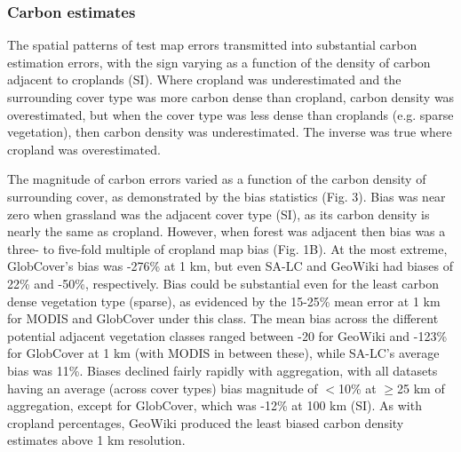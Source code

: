 \documentclass[a4paper]{article}
\begin{document}
\subsubsection*{Carbon estimates}
\vspace{-0.2 cm}
The spatial patterns of test map errors transmitted into substantial carbon estimation errors, with the sign varying as a function of the density of carbon adjacent to croplands (SI). Where cropland was underestimated and the surrounding cover type was more carbon dense than cropland, carbon density was overestimated, but when the cover type was less dense than croplands (e.g. sparse vegetation), then carbon density was underestimated. The inverse was true where cropland was overestimated. 

The magnitude of carbon errors varied as a function of the carbon density of surrounding cover, as demonstrated by the bias statistics (Fig. 3). Bias was near zero when grassland was the adjacent cover type (SI), as its carbon density is nearly the same as cropland. However, when forest was adjacent then bias was a three- to five-fold multiple of cropland map bias (Fig. 1B). At the most extreme, GlobCover's bias was -276\% at 1 km, but even SA-LC and GeoWiki had biases of 22\% and -50\%, respectively. Bias could be substantial even for the least carbon dense vegetation type (sparse), as evidenced by the 15-25\% mean error at 1 km for MODIS and GlobCover under this class.  The mean bias across the different potential adjacent vegetation classes ranged between -20 for GeoWiki and -123\% for GlobCover at 1 km (with MODIS in between these), while SA-LC's average bias was 11\%.  Biases declined fairly rapidly with aggregation, with all datasets having an average (across cover types) bias magnitude of $<$10\% at $\geq$25 km of aggregation, except for GlobCover, which was -12\% at 100 km (SI).  As with cropland percentages, GeoWiki produced the least biased carbon density estimates above 1 km resolution. 

\end{document}
